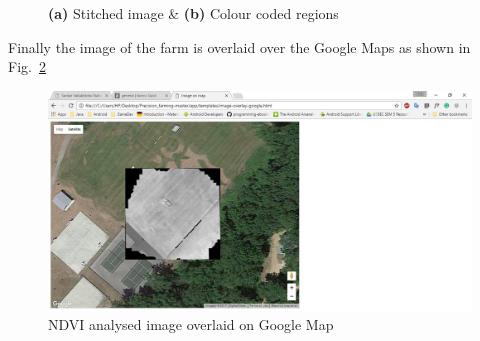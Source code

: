 \begin{figure}[h]
	\hfill
	\hfill
	\hfill
	\caption{\label{fig: res-4}\textbf{(a)} Stitched image \& \textbf{(b)} Colour coded regions}
\end{figure}


Finally the image of the farm is overlaid over the Google Maps as shown in Fig.~\ref{fig: res-5}

\begin{figure}[h]
	\includegraphics[width=1\linewidth]{fin_img_20}
	\centering
	\caption{\label{fig: res-5}NDVI analysed image overlaid on Google Map}
\end{figure}



